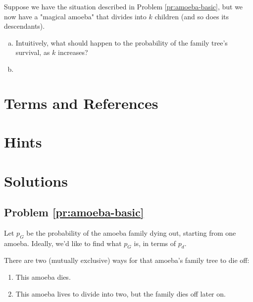\begin{problem}
\label{pr:amoeba-caprep}
\end{problem}

\begin{problem}
\label{pr:amoeba-nstart}
\end{problem}

\begin{problem}
\label{pr:amoeba-ndesc}
Suppose we have the situation described in Problem \ref{pr:amoeba-basic}, but we now have a "magical amoeba" that divides into $k$ children (and so does its descendants). 

\begin{enumerate}[(a)]
\item Intuitively, what should happen to the probability of the family tree's survival, as $k$ increases?
\item 
\end{enumerate}
\end{problem}

\newpage
\section{Terms and References}

\section{Hints}

\newpage
\section{Solutions}

\subsection{Problem \ref{pr:amoeba-basic}}

Let $p_G$ be the probability of the amoeba family dying out, starting from one amoeba. Ideally, we'd like to find what $p_G$ is, in terms of $p_d$. 

There are two (mutually exclusive) ways for that amoeba's family tree to die off: 
\begin{enumerate}
\item This amoeba dies.
\item This amoeba lives to divide into two, but the family dies off later on.
\end{enumerate} \hfill

